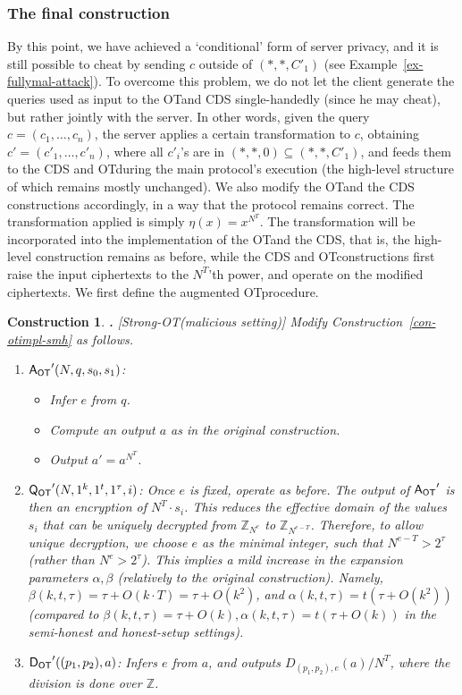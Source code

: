 \documentclass[11pt]{article}
\newcommand{\queot}{{\sf Q_{OT}}}
\newcommand{\ansot}{{\sf A_{OT}}}
\newcommand{\decot}{{\sf D_{OT}}}
\newcommand{\otl}{{\tau}}
\newcommand{\decdj}{{D}_{(p_1,p_2),e}}
\newcommand{\Z}{{\mathbb{Z}}}
\newtheorem{CONSTRUCTION}{Construction}[section]
\newenvironment{construction}{\begin{CONSTRUCTION} \hspace{-.85em} {\bf .} \rm}%
	{\end{CONSTRUCTION}}
\newcommand{\ot}{\mbox{OT}\;}
\newcommand{\strongot}{{Strong-OT\;}}
\begin{document}
\subsubsection{The final construction}
\label{subsec-mal-uncond}
By this point, we have achieved a `conditional' form of server privacy, and it is still possible
to cheat by sending $c$ outside of $(*,*,C'_1)$ (see Example~\ref{ex-fullymal-attack}).
To overcome this problem, we do not let the client
generate the queries used as input to the \ot and CDS single-handedly (since he may cheat), but rather
jointly with the server. In other words, given the query $c=(c_1,\ldots,c_n)$, the server applies a certain transformation to $c$, obtaining $c'=(c'_1,\ldots,c'_n)$, where all $c'_i$'s are in $(*,*,0)\subseteq{(*,*,C'_1)}$, and feeds them to the CDS and \ot during the main protocol's execution (the high-level structure of which remains mostly unchanged). We also modify the \ot and the CDS constructions accordingly, in a way that the protocol remains correct.
The transformation applied is simply $\eta(x)=x^{N^T}$. The transformation will be incorporated into the implementation of the \ot and the CDS, that is, the high-level construction remains as before, while the CDS and \ot constructions first raise the input ciphertexts to the $N^T$'th power, and operate on the modified ciphertexts. We first define the augmented \ot procedure.
\begin{construction}[\strongot (malicious setting)]
  \label{con-otimpl-mal}
  Modify Construction~\ref{con-otimpl-smh} as follows.
  \begin{enumerate}
    \item $\ansot'(N,q,s_0,s_1)$:
    \begin{itemize}
      \item Infer $e$ from $q$.
      \item Compute an output $a$ as in the original construction.
      \item Output $a'=a^{N^T}$.
    \end{itemize}
    \item $\queot'(N,1^k,1^t,1^{\otl},i)$:
    Once $e$ is fixed, operate as before.
    The output of $\ansot'$ is then an encryption of $N^T\cdot s_i$.
    This reduces the effective domain of the values $s_i$ that can be uniquely decrypted from $\Z_{N^e}$
    to $\Z_{N^{e-T}}$. Therefore, to allow unique decryption, we choose $e$ as the minimal integer,
    such that $N^{e-T}>2^{\otl}$ (rather than $N^e>2^{\otl}$). This implies a mild increase in the expansion
    parameters $\alpha,\beta$ (relatively to the original construction). Namely, $\beta(k,t,\otl)=\otl+O(k\cdot T)=\otl+O(k^2)$, and $\alpha(k,t,\otl)=t(\otl+O(k^2))$ (compared to $\beta(k,t,\otl)=\otl+O(k),\alpha(k,t,\otl)=t(\otl+O(k))$ in the semi-honest
    and honest-setup settings).
    \item $\decot'((p_1,p_2),a)$: Infers $e$ from $a$, and outputs $\decdj(a)/N^T$, where the division is done over
    $\Z$.
  \end{enumerate}
\end{construction}
\end{document}
